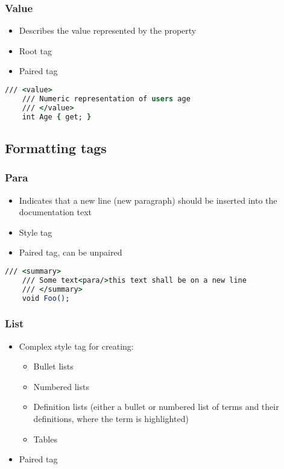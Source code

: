 \subsubsection*{Value}
\begin{itemize}
    \item Describes the value represented by the property
    \item Root tag
    \item Paired tag
\end{itemize}

\begin{lstlisting}[language=csh]
    /// <value>
    /// Numeric representation of users age
    /// </value>
    int Age { get; }
\end{lstlisting}

\subsection{Formatting tags}

\subsubsection*{Para}
\begin{itemize}
    \item Indicates that a new line (new paragraph) should be inserted into the documentation text
    \item Style tag
    \item Paired tag, can be unpaired
\end{itemize}

\begin{lstlisting}[language=csh]
    /// <summary>
    /// Some text<para/>this text shall be on a new line
    /// </summary>
    void Foo();
\end{lstlisting}

\subsubsection*{List} \label{sec:listTag}
\begin{itemize}
    \item Complex style tag for creating:
    \begin{itemize}
        \item Bullet lists
        \item Numbered lists
        \item Definition lists (either a bullet or numbered list of terms and their definitions, where the term is highlighted)
        \item Tables
    \end{itemize}
    \item Paired tag
\end{itemize}


